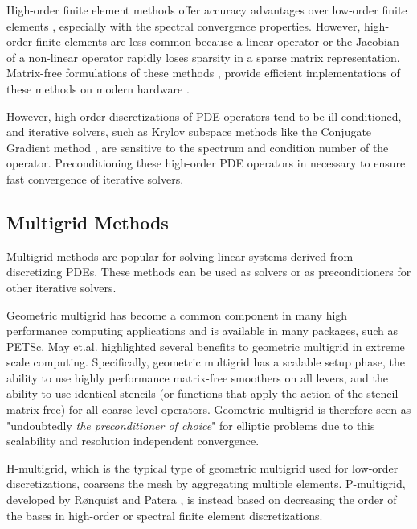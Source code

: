 High-order finite element methods offer accuracy advantages over low-order finite elements \cite{demkowicz1989toward, oden1989toward, rachowicz1989toward}, especially with the spectral convergence properties.
However, high-order finite elements are less common because a linear operator or the Jacobian of a non-linear operator rapidly loses sparsity in a sparse matrix representation.
Matrix-free formulations of these methods \cite{brown2010efficient, deville2002highorder, knoll2004jacobian}, provide efficient implementations of these methods on modern hardware \cite{libceed-user-manual, fischer2020scalability, kronbichler2019multigrid}.

However, high-order discretizations of PDE operators tend to be ill conditioned, and iterative solvers, such as Krylov subspace methods like the Conjugate Gradient method \cite{hestenes1952methods, shewchuk1994introduction}, are sensitive to the spectrum and condition number of the operator.
Preconditioning these high-order PDE operators in necessary to ensure fast convergence of iterative solvers.

\subsection{Multigrid Methods}

Multigrid methods \cite{brandt1982guide, briggs2000multigrid, stuben1982multigrid} are popular for solving linear systems derived from discretizing PDEs.
These methods can be used as solvers or as preconditioners for other iterative solvers.

Geometric multigrid has become a common component in many high performance computing applications and is available in many packages, such as PETSc.
May et.al. \cite{may2016extreme} highlighted several benefits to geometric multigrid in extreme scale computing.
Specifically, geometric multigrid has a scalable setup phase, the ability to use highly performance matrix-free smoothers on all levers, and the ability to use identical stencils (or functions that apply the action of the stencil matrix-free) for all coarse level operators.
Geometric multigrid is therefore seen as "undoubtedly {\textit{the preconditioner of choice}}" for elliptic problems due to this scalability and resolution independent convergence.

H-multigrid, which is the typical type of geometric multigrid used for low-order discretizations, coarsens the mesh by aggregating multiple elements.
P-multigrid, developed by R{\o}nquist and Patera \cite{ronquist1987spectral}, is instead based on decreasing the order of the bases in high-order or spectral finite element discretizations.

